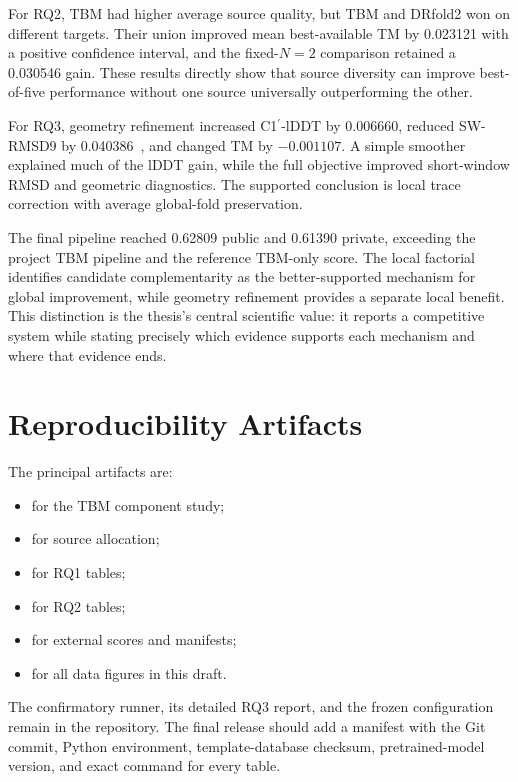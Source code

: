 \documentclass[12pt,a4paper,oneside]{report}
\newcommand{\cprime}{C1$^{\prime}$}
\newcommand{\angstrom}{\text{\AA}}
\begin{document}
For RQ2, TBM had higher average source quality, but TBM and DRfold2 won on different
targets. Their union improved mean best-available TM by 0.023121 with a positive
confidence interval, and the fixed-$N=2$ comparison retained a 0.030546 gain. These
results directly show that source diversity can improve best-of-five performance without
one source universally outperforming the other.

For RQ3, geometry refinement increased \cprime{}-lDDT by 0.006660, reduced SW-RMSD9 by
0.040386~\angstrom{}, and changed TM by $-0.001107$. A simple smoother explained much
of the lDDT gain, while the full objective improved short-window RMSD and geometric
diagnostics. The supported conclusion is local trace correction with average global-fold
preservation.

The final pipeline reached 0.62809 public and 0.61390 private, exceeding the project TBM
pipeline and the reference TBM-only score. The local factorial identifies candidate
complementarity as the better-supported mechanism for global improvement, while geometry
refinement provides a separate local benefit. This distinction is the thesis's central
scientific value: it reports a competitive system while stating precisely which evidence
supports each mechanism and where that evidence ends.

\appendix

\chapter{Reproducibility Artifacts}
\label{app:repro_en}

The principal artifacts are:
\begin{itemize}
  \item {} for the TBM component study;
  \item {} for source allocation;
  \item {} for RQ1 tables;
  \item {} for RQ2 tables;
  \item {} for external scores and manifests;
  \item {} for all data figures in this draft.
\end{itemize}

The confirmatory runner, its detailed RQ3 report, and the frozen configuration remain in
the repository. The final release should add a manifest with the Git commit, Python
environment, template-database checksum, pretrained-model version, and exact command for
every table.
\end{document}
